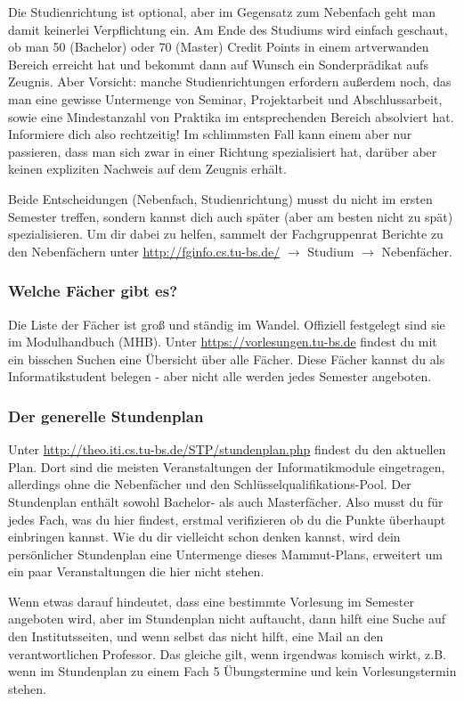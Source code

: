 	Die Studienrichtung ist  optional, aber im Gegensatz zum Nebenfach geht man damit keinerlei Verpflichtung ein. Am Ende des Studiums wird einfach geschaut, ob man 50 (Bachelor) oder 70 (Master) Credit Points in einem artverwanden Bereich erreicht hat und bekommt dann auf Wunsch ein Sonderprädikat aufs Zeugnis. Aber Vorsicht: manche Studienrichtungen erfordern außerdem noch, das man eine gewisse Untermenge von Seminar, Projektarbeit und Abschlussarbeit, sowie eine Mindestanzahl von Praktika im entsprechenden Bereich absolviert hat. Informiere dich also rechtzeitig! Im schlimmsten Fall kann einem aber nur passieren, dass man sich zwar in einer Richtung spezialisiert hat, darüber aber keinen expliziten Nachweis auf dem Zeugnis erhält.

	Beide Entscheidungen (Nebenfach, Studienrichtung) musst du nicht im ersten Semester treffen, sondern kannst dich auch später (aber am besten nicht zu spät) spezialisieren. Um dir dabei zu helfen, sammelt der Fachgruppenrat Berichte zu den Nebenfächern unter \url{http://fginfo.cs.tu-bs.de/} $\rightarrow$ Studium $\rightarrow$ Nebenfächer.

\subsubsection{Welche Fächer gibt es?}
	Die Liste der Fächer ist groß und ständig im Wandel. Offiziell festgelegt sind sie im Modulhandbuch (MHB). Unter \url{https://vorlesungen.tu-bs.de} findest du mit ein bisschen Suchen eine Übersicht über alle Fächer. Diese Fächer kannst du als Informatikstudent belegen - aber nicht alle werden jedes Semester angeboten.

\subsubsection{Der generelle Stundenplan}
	Unter \url{http://theo.iti.cs.tu-bs.de/STP/stundenplan.php} findest du den aktuellen Plan. Dort sind die meisten Veranstaltungen der Informatikmodule eingetragen, allerdings ohne die Nebenfächer und den Schlüsselqualifikations-Pool. Der Stundenplan enthält sowohl Bachelor- als auch Masterfächer. Also musst du für jedes Fach, was du hier findest, erstmal verifizieren ob du die Punkte überhaupt einbringen kannst. Wie du dir vielleicht schon denken kannst, wird dein persönlicher Stundenplan eine Untermenge dieses Mammut-Plans, erweitert um ein paar Veranstaltungen die hier nicht stehen.

	Wenn etwas darauf hindeutet, dass eine bestimmte Vorlesung im Semester angeboten wird, aber im Stundenplan nicht auftaucht, dann hilft eine Suche auf den Institutsseiten, und wenn selbst das nicht hilft, eine Mail an den verantwortlichen Professor. Das gleiche gilt, wenn irgendwas komisch wirkt, z.B. wenn im Stundenplan zu einem Fach 5 Übungstermine und kein Vorlesungstermin stehen.

